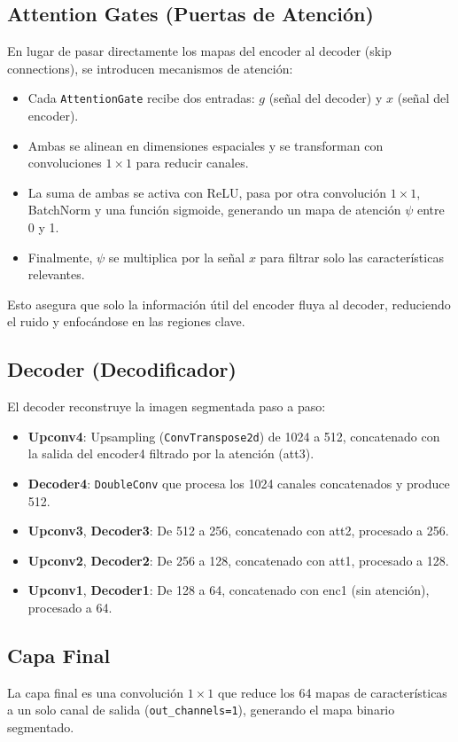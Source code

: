 \subsection*{Attention Gates (Puertas de Atención)}
En lugar de pasar directamente los mapas del encoder al decoder (skip connections), se introducen mecanismos de atención:
\begin{itemize}
    \item Cada \texttt{AttentionGate} recibe dos entradas: $g$ (señal del decoder) y $x$ (señal del encoder).
    \item Ambas se alinean en dimensiones espaciales y se transforman con convoluciones $1\times1$ para reducir canales.
    \item La suma de ambas se activa con ReLU, pasa por otra convolución $1\times1$, BatchNorm y una función sigmoide, generando un mapa de atención $\psi$ entre 0 y 1.
    \item Finalmente, $\psi$ se multiplica por la señal $x$ para filtrar solo las características relevantes.
\end{itemize}
Esto asegura que solo la información útil del encoder fluya al decoder, reduciendo el ruido y enfocándose en las regiones clave.

\subsection*{Decoder (Decodificador)}
El decoder reconstruye la imagen segmentada paso a paso:
\begin{itemize}
    \item \textbf{Upconv4}: Upsampling (\texttt{ConvTranspose2d}) de 1024 a 512, concatenado con la salida del encoder4 filtrado por la atención (att3).
    \item \textbf{Decoder4}: \texttt{DoubleConv} que procesa los 1024 canales concatenados y produce 512.
    \item \textbf{Upconv3}, \textbf{Decoder3}: De 512 a 256, concatenado con att2, procesado a 256.
    \item \textbf{Upconv2}, \textbf{Decoder2}: De 256 a 128, concatenado con att1, procesado a 128.
    \item \textbf{Upconv1}, \textbf{Decoder1}: De 128 a 64, concatenado con enc1 (sin atención), procesado a 64.
\end{itemize}

\subsection*{Capa Final}
La capa final es una convolución $1\times1$ que reduce los 64 mapas de características a un solo canal de salida (\texttt{out\_channels=1}), generando el mapa binario segmentado.

